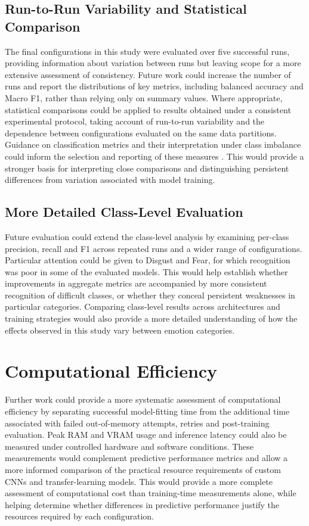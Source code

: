 \documentclass[12pt, a4paper]{report}
\let\oldsection\section
\renewcommand{\section}{%
    \Needspace{6\baselineskip}%
    \oldsection
}
\let\oldsubsection\subsection
\renewcommand{\subsection}{%
    \Needspace{6\baselineskip}%
    \oldsubsection
}
\begin{document}
			\subsection{Run-to-Run Variability and Statistical Comparison}
				
				The final configurations in this study were evaluated over five successful runs, providing information about variation between runs but leaving scope for a more extensive assessment of consistency. Future work could increase the number of runs and report the distributions of key metrics, including balanced accuracy and Macro F1, rather than relying only on summary values. Where appropriate, statistical comparisons could be applied to results obtained under a consistent experimental protocol, taking account of run-to-run variability and the dependence between configurations evaluated on the same data partitions. Guidance on classification metrics and their interpretation under class imbalance could inform the selection and reporting of these measures \cite{Opitz2024ClassificationMetrics, Farhadpour2024MetricsImbalance}. This would provide a stronger basis for interpreting close comparisons and distinguishing persistent differences from variation associated with model training.
				
			\subsection{More Detailed Class-Level Evaluation}
				
				Future evaluation could extend the class-level analysis by examining per-class precision, recall and F1 across repeated runs and a wider range of configurations. Particular attention could be given to Disgust and Fear, for which recognition was poor in some of the evaluated models. This would help establish whether improvements in aggregate metrics are accompanied by more consistent recognition of difficult classes, or whether they conceal persistent weaknesses in particular categories. Comparing class-level results across architectures and training strategies would also provide a more detailed understanding of how the effects observed in this study vary between emotion categories.
				
		\section{Computational Efficiency}
			
			Further work could provide a more systematic assessment of computational efficiency by separating successful model-fitting time from the additional time associated with failed out-of-memory attempts, retries and post-training evaluation. Peak RAM and VRAM usage and inference latency could also be measured under controlled hardware and software conditions. These measurements would complement predictive performance metrics and allow a more informed comparison of the practical resource requirements of custom CNNs and transfer-learning models. This would provide a more complete assessment of computational cost than training-time measurements alone, while helping determine whether differences in predictive performance justify the resources required by each configuration.
			
\end{document}
